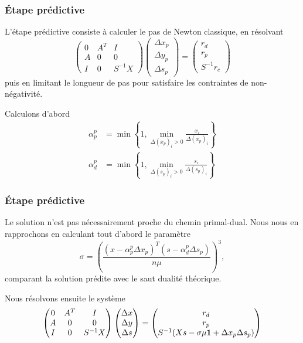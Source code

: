 \documentclass[usepdftitle=false, aspectratio=169]{beamer}
\begin{document}
\begin{frame}
\frametitle{Étape prédictive}

L'étape prédictive consiste à calculer le pas de Newton classique, en résolvant
$$\begin{pmatrix}
	0 & A^T & I  \\
	A & 0 & 0\\
	I & 0 & S^{-1}X
\end{pmatrix}\begin{pmatrix}
	\Delta x_p  \\
	\Delta y_p \\
	\Delta s_p
\end{pmatrix} = \begin{pmatrix}
	r_d  \\
	r_p  \\
	S^{-1}r_c 
\end{pmatrix}$$
puis en limitant le longueur de pas pour satisfaire les contraintes de non-négativité.

\mbox{}

Calculons d'abord
\begin{align*}
\alpha_p^p &= \min \left\{1, \min_{\Delta (x_p)_i > 0} \frac{x_i}{\Delta (x_p)_i } \right\} \\
\alpha_d^p &= \min \left\{1, \min_{\Delta (s_p)_i > 0} \frac{s_i}{\Delta (s_p)_i } \right\}
\end{align*}

\end{frame}

\begin{frame}
\frametitle{Étape prédictive}

Le solution n'est pas nécessairement proche du chemin primal-dual.
Nous nous en rapprochons en calculant tout d'abord le paramètre
$$
\sigma = \left(\frac{(x - \alpha_p^p\Delta x_p)^T(s - \alpha_d^p\Delta s_p)}{n\mu}\right)^3,
$$
comparant la solution prédite avec le saut dualité théorique.

\mbox{}

Nous résolvons ensuite le système
$$\begin{pmatrix}
	0 & A^T & I  \\
	A & 0 & 0\\
	I & 0 & S^{-1}X
\end{pmatrix}\begin{pmatrix}
	\Delta x  \\
	\Delta y \\
	\Delta s
\end{pmatrix} = \begin{pmatrix}
	r_d  \\
	r_p  \\
	S^{-1}(Xs - \sigma \mu {\boldsymbol{1}} + \Delta x_p \Delta s_p) 
\end{pmatrix}$$

\end{frame}
\end{document}
